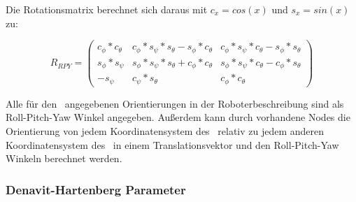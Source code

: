 Die Rotationsmatrix berechnet sich daraus mit $c_x=cos(x)$ und $s_x=sin(x)$ zu:

\begin{equation}
  R_{RPY}=
  \begin{pmatrix}
    c_\phi*c_\theta     
    & c_\phi*s_\psi*s_\theta-s_\phi*c_\theta
    & c_\phi*s_\psi*c_\theta-s_\phi*s_\theta\\

    s_\phi*s_\psi          
    & s_\phi*s_\psi*s_\theta+c_\phi*c_\theta
    & s_\phi*s_\psi*c_\theta-c_\phi*s_\theta\\
  
    -s_\psi    
    & c_\psi*s_\theta   
    & c_\phi*c_\theta
  
  \end{pmatrix}
\end{equation}

Alle für den \cob\ angegebenen Orientierungen in der Roboterbeschreibung sind 
als Roll-Pitch-Yaw Winkel angegeben. Außerdem kann durch vorhandene Nodes 
die Orientierung von jedem Koordinatensystem des \cob\ relativ zu jedem 
anderen Koordinatensystem des \cob\ in einem Translationsvektor und den Roll-Pitch-Yaw
Winkeln berechnet werden.


\subsubsection{Denavit-Hartenberg Parameter}
\label{ssub:Denavit-Hartenberg Parameter}

